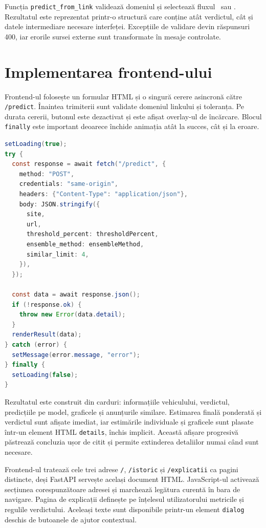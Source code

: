 Funcția \texttt{predict\_from\_link} validează domeniul și selectează fluxul \autovit\ sau \mobilede. Rezultatul este reprezentat printr-o structură care conține atât verdictul, cât și datele intermediare necesare interfeței. Excepțiile de validare devin răspunsuri 400, iar erorile sursei externe sunt transformate în mesaje controlate.

\section{Implementarea frontend-ului}
\label{sec:implementation-frontend}

Frontend-ul folosește un formular HTML și o singură cerere asincronă către \texttt{/predict}. Înaintea trimiterii sunt validate domeniul linkului și toleranța. Pe durata cererii, butonul este dezactivat și este afișat overlay-ul de încărcare. Blocul \texttt{finally} este important deoarece închide animația atât la succes, cât și la eroare.

\begin{lstlisting}[language=Java,caption={Cererea frontend către API și închiderea stării de încărcare},label={lst:frontend-fetch}]
setLoading(true);
try {
  const response = await fetch("/predict", {
    method: "POST",
    credentials: "same-origin",
    headers: {"Content-Type": "application/json"},
    body: JSON.stringify({
      site,
      url,
      threshold_percent: thresholdPercent,
      ensemble_method: ensembleMethod,
      similar_limit: 4,
    }),
  });

  const data = await response.json();
  if (!response.ok) {
    throw new Error(data.detail);
  }
  renderResult(data);
} catch (error) {
  setMessage(error.message, "error");
} finally {
  setLoading(false);
}
\end{lstlisting}

Rezultatul este construit din carduri: informațiile vehiculului, verdictul, predicțiile pe model, graficele și anunțurile similare. Estimarea finală ponderată și verdictul sunt afișate imediat, iar estimările individuale și graficele sunt plasate într-un element HTML \texttt{details}, închis implicit. Această afișare progresivă păstrează concluzia ușor de citit și permite extinderea detaliilor numai când sunt necesare.

Frontend-ul tratează cele trei adrese \texttt{/}, \texttt{/istoric} și \texttt{/explicatii} ca pagini distincte, deși FastAPI servește același document HTML. JavaScript-ul activează secțiunea corespunzătoare adresei și marchează legătura curentă în bara de navigare. Pagina de explicații definește pe înțelesul utilizatorului metricile și regulile verdictului. Aceleași texte sunt disponibile printr-un element \texttt{dialog} deschis de butoanele de ajutor contextual.

